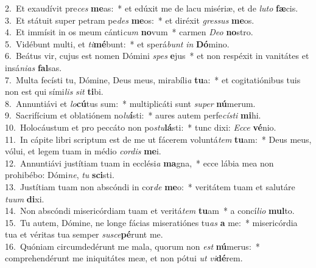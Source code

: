 {2.~}Et exaudívit pre\textit{ces} \textbf{me}as:~* et edúxit me de lacu misériæ, et de \textit{lu}\textit{to} \textbf{fæ}cis.\\
{3.~}Et státuit super petram pe\textit{des} \textbf{me}os:~* et diréxit \textit{gres}\textit{sus} \textbf{me}os.\\
{4.~}Et immísit in os meum cánti\textit{cum} \textbf{no}vum~* carmen \textit{De}\textit{o} \textbf{no}stro.\\
{5.~}Vidébunt multi, et \textit{ti}\textbf{mé}bunt:~* et sperá\textit{bunt} \textit{in} \textbf{Dó}mino.\\
{6.~}Beátus vir, cujus est nomen Dómini \textit{spes} \textbf{e}jus~* et non respéxit in vanitátes et insá\textit{ni}\textit{as} \textbf{fal}sas.\\
{7.~}Multa fecísti tu, Dómine, Deus meus, mirabíli\textit{a} \textbf{tu}a:~* et cogitatiónibus tuis non est qui sími\textit{lis} \textit{sit} \textbf{ti}bi.\\
{8.~}Annuntiávi et \textit{lo}\textbf{cú}tus sum:~* multiplicáti sunt \textit{su}\textit{per} \textbf{nú}merum.\\
{9.~}Sacrifícium et oblatiónem no\textit{lu}\textbf{í}sti:~* aures autem perfe\textit{cí}\textit{sti} \textbf{mi}hi.\\
{10.~}Holocáustum et pro peccáto non po\textit{stu}\textbf{lá}sti:~* tunc dixi: \textit{Ec}\textit{ce} \textbf{vé}nio.\\
{11.~}In cápite libri scriptum est de me ut fácerem voluntá\textit{tem} \textbf{tu}am:~* Deus meus, vólui, et legem tuam in médio \textit{cor}\textit{dis} \textbf{me}i.\\
{12.~}Annuntiávi justítiam tuam in ecclési\textit{a} \textbf{ma}gna,~* ecce lábia mea non prohibébo: Dómi\textit{ne}, \textit{tu} \textbf{sci}sti.\\
{13.~}Justítiam tuam non abscóndi in cor\textit{de} \textbf{me}o:~* veritátem tuam et salutáre \textit{tu}\textit{um} \textbf{di}xi.\\
{14.~}Non abscóndi misericórdiam tuam et veritá\textit{tem} \textbf{tu}am~* a concí\textit{li}\textit{o} \textbf{mul}to.\\
{15.~}Tu autem, Dómine, ne longe fácias miseratiónes tu\textit{as} \textbf{a} me:~* misericórdia tua et véritas tua semper \textit{su}\textit{sce}\textbf{pé}runt me.\\
{16.~}Quóniam circumdedérunt me mala, quorum non \textit{est} \textbf{nú}merus:~* comprehendérunt me iniquitátes meæ, et non pótui \textit{ut} \textit{vi}\textbf{dé}rem.\\
